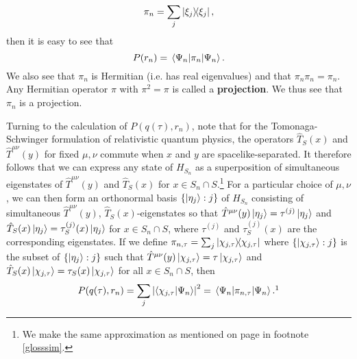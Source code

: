 \begin{equation}\label{tauprojection}
\pi_n=\sum_j\dyad{\xi_j},
\end{equation}
then it is easy to see that
$$P(r_n)=\ev*{\pi_n}{\Psi_n}.$$
We also see that $\pi_n$ is Hermitian (i.e. has real eigenvalues) and that $\pi_n \pi_n = \pi_n$. Any Hermitian operator $\pi$ with $\pi^2=\pi$ is called a \textbf{projection}. We thus see that $\pi_n$ is a projection.

Turning to the calculation of $P(q(\tau), r_n)$, note that for the Tomonaga-Schwinger formulation of relativistic quantum physics, the operators $\hat{T}_S(x)$ and $\hat{T}^{\mu\nu}(y)$ for fixed $\mu,\nu$ commute when $x$ and $y$ are spacelike-separated. It therefore follows that we can express any state of $H_{S_n}$ as a superposition of simultaneous eigenstates of $\hat{T}^{\mu\nu}(y)$ and $\hat{T}_S(x)$ for $x\in S_n\cap S$.\footnote{We make the same approximation as mentioned on page \pageref{simultaneous} in footnote \ref{glosssim}.}  For a particular choice of $\mu,\nu$, we can then form an orthonormal basis $\{\ket{\eta_j}:j\}$ of $H_{S_n}$ consisting of simultaneous $\hat{T}^{\mu\nu}(y)$, $\hat{T}_S(x)$-eigenstates so that $\hat{T}^{\mu\nu}(y)\ket{\eta_j}=\tau^{(j)}\ket{\eta_j}$ and $\hat{T}_{S}(x)\ket{\eta_j}=\tau_S^{(j)}(x)\ket{\eta_j}$ for $x\in S_n\cap S$, where $\tau^{(j)}$ and $\tau_S^{(j)}(x)$ are the corresponding eigenstates. If we define  $\pi_{n,\tau}=\sum_j\dyad{\chi_{j,\tau}}$ where $\{\ket{\chi_{j,\tau}}:j\}$ is the subset of $\{\ket{\eta_j}:j\}$ such that $\hat{T}^{\mu\nu}(y)\ket{\chi_{j,\tau}}=\tau\ket{\chi_{j,\tau}}$ and $\hat{T}_S(x)\ket{\chi_{j,\tau}}=\tau_S(x)\ket{\chi_{j,\tau}}$ for all $x\in S_n\cap S$, then 
\begin{equation}\label{pqtauri}
P(q(\tau), r_n)=\sum_j \abs{ \ip{\chi_{j,\tau}}{\Psi_n}}^2=\ev*{\pi_{n,\tau}}{\Psi_n}.\protect\footnotemark
\end{equation}
